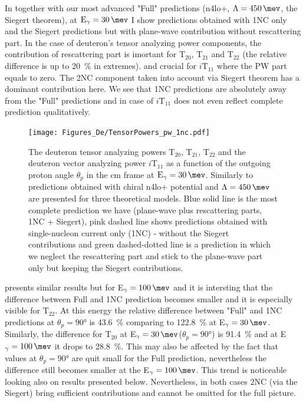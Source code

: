     In  together with our most advanced "Full" predictions 
    (\gls{n4lo+}, $\Lambda=\SI{450}{\mev}$, the Siegert theorem),
    at $\text{E}_\gamma = \SI{30}{\mev}$ 
    I show predictions obtained with 1NC only and 
    the Siegert predictions but with plane-wave contribution without rescattering part.
    In the case of deuteron's tensor analyzing power components, the contribution of rescattering part is  
    imortant for T$_{20}$, T$_{21}$ and T$_{22}$ (the relative difference is up to \SI{20}{\percent} 
    in extremes).
    and crucial for
    $i\text{T}_{11}$ where the PW part equals to zero.
    The 2NC component taken into account via Siegert theorem has a dominant contribution here. We see that 
    1NC predictions are absolutely away from the "Full" predictions and in case of $i\text{T}_{11}$
    does not even reflect complete prediction qualitatively.

    \begin{figure}[h]
        \begin{center}
        \texttt{[image: Figures\_De/TensorPowers\_pw\_1nc.pdf]}
        \end{center}
        \caption{The deuteron tensor analyzing powers T$_{20}$, T$_{21}$, T$_{22}$ and 
        the deuteron vector analyzing power $i\text{T}_{11}$ as a function of the
        outgoing proton angle $\theta_p$ in the \gls{cm} frame at $\text{E}_\gamma = \SI{30}{\mev}$.
        Similarly to  predictions obtained with chiral \gls{n4lo+} potential
        and $\Lambda=\SI{450}{\mev}$ are presented for three theoretical models.
        Blue solid line is the most complete prediction we have (plane-wave plus rescattering parts, 1NC + Siegert), pink dashed line shows predictions obtained with
        single-nucleon current only (1NC) - without the Siegert contributions and green dashed-dotted line
        is a prediction in which we neglect the rescattering part
        and stick to the plane-wave part only but keeping the Siegert contributions.}
        \label{tensor_pw_1nc}
    \end{figure}

     presents similar results but for E$_\gamma = \SI{100}{\mev}$
    and it is intersting that the difference between Full and 1NC prediction becomes smaller
    and it is especially visible for $\text{T}_{22}$. At this energy the relative difference 
    between "Full" and 1NC predictions
    at $\theta_p = \ang{90}$ is \SI{43.6}{\percent} comparing to \SI{122.8}{\percent}
    at E$_\gamma = \SI{30}{\mev}$. Similarly, the difference for T$_{20}$
    at E$_\gamma = \SI{30}{\mev}$($\theta_p = \ang{90}$) is \SI{91.4}{\percent}
    and at E$_\gamma = \SI{100}{\mev}$ it drops to \SI{28.8}{\percent}.
    This may also be affected by the fact that values at $\theta_p = \ang{90}$ 
    are quit small for the Full prediction, nevertheless the difference still becomes smaller at the
    E$_\gamma = \SI{100}{\mev}$.
    This trend is noticeable looking also on results presented below.
    Nevertheless, in both cases 2NC (via the Siegert) bring sufficient contributions
    and cannot be omitted for the full picture.

